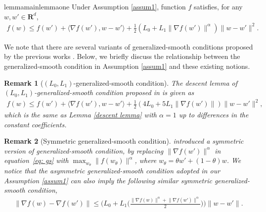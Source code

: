 \documentclass[10pt]{article} %
\def\eqref#1{equation~\ref{#1}}
\newtheorem{remark}{Remark}
\begin{document}
\begin{restatable}{lemma}{mainlemmaone}
\label{descent lemma}
Under Assumption \ref{assum1}, function $f$ satisfies, for any $w, w' \in \mathbf{R}^d$,
    \begin{align}
        f(w)\leq f(w')+ \langle \nabla f(w'), w - w' \rangle
        + \frac{1}{2} (L_0+L_1 \big \| \nabla f(w')\big \|^{\alpha}) \big \| w - w' \big \|^2.
        \label{origindescent}
    \end{align}
\end{restatable}
 
We note that there are several variants of generalized-smooth conditions proposed by the previous works \citep{zhang2020gradientclippingacceleratestraining,jin2021nonconvex,pmlr-v202-chen23ar}. Below, we briefly discuss the relationship between the generalized-smooth condition in Assumption \ref{assum1} and these existing notions.
\begin{remark}[$(L_0, L_1)$-generalized-smooth condition]
The descent lemma of $(L_0, L_1)$-generalized-smooth condition proposed in \citet{zhang2020gradientclippingacceleratestraining} is given as
\begin{align}
    f(w)\leq f(w')+ \langle \nabla f(w'), w - w' \rangle +\frac{1}{2}(4L_0+5L_1 \| \nabla f(w')\|) \| w - w' \|^2,\nonumber 
\end{align}
which is the same as Lemma \ref{descent lemma} with $\alpha = 1$ up to differences in the constant coefficients. 

\end{remark}
\begin{remark}[Symmetric generalized-smooth condition]
\citet{pmlr-v202-chen23ar} introduced a symmetric version of generalized-smooth condition, by replacing $\|\nabla f(w') \|^{\alpha}$ in \eqref{eq: gs} with $\max_{w_{\theta}}\|f(w_{\theta})\|^{\alpha}$, where $w_{\theta}=\theta w'+(1-\theta)w$. 
We notice that the asymmetric generalized-smooth condition adopted in our Assumption \ref{assum1} can also imply the following similar symmetric generalized-smooth condition,
\begin{align}
     \big \|\nabla f(w)- \nabla f(w') \big \|\leq \big(L_0 +L_1 \big(\frac{\big \|\nabla f(w) \big \|^{\alpha}+\big \|\nabla f(w') \big \|^{\alpha}}{2}\big)\big)\big \|w - w' \big \|.
     \label{symmetric gs}
\end{align}
\end{remark}
\end{document}
